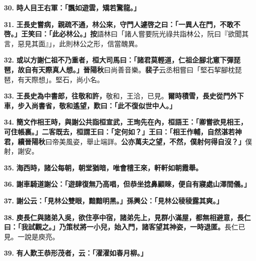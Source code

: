 \textbf{30.} \textbf{時人目王右軍：「飄如遊雲，矯若驚龍。」}

\textbf{31.} \textbf{王長史嘗病，親疏不通，林公來，守門人遽啓之曰：「一異人在門，不敢不啓。」王笑曰：「此必林公。」}{\footnotesize \textbf{按}語林曰「諸人嘗要阮光祿共詣林公，阮曰『欲聞其言，惡見其面』」，此則林公之形，信當醜異。}

\textbf{32.} \textbf{或以方謝仁祖不乃重者，桓大司馬曰：「諸君莫輕道，仁祖企腳北窻下彈琵琶，故自有天際真人想。」}{\footnotesize \textbf{晉陽秋}曰尚善音樂。\textbf{裴子}云丞相嘗曰「堅石挈腳枕琵琶，有天際想」。堅石，尚小名。}

\textbf{33.} \textbf{王長史為中書郎，往敬和許，}{\footnotesize 敬和，王洽，已見。}\textbf{爾時積雪，長史從門外下車，步入尚書省，敬和遙望，歎曰：「此不復似世中人。」}

\textbf{34.} \textbf{簡文作相王時，與謝公共詣桓宣武，王珣先在內，桓語王：「卿嘗欲見相王，可住帳裏。」二客既去，桓謂王曰：「定何如？」王曰：「相王作輔，自然湛若神君，}{\footnotesize \textbf{續晉陽秋}曰帝美風姿，舉止端詳。}\textbf{公亦萬夫之望，不然，僕射何得自沒？」}{\footnotesize 僕射，謝安。}

\textbf{35.} \textbf{海西時，諸公每朝，朝堂猶暗，唯會稽王來，軒軒如朝霞舉。}

\textbf{36.} \textbf{謝車騎道謝公：「遊肆復無乃高唱，但恭坐捻鼻顧睞，便自有寢處山澤間儀。」}

\textbf{37.} \textbf{謝公云：「見林公雙眼，黯黯明黑。」孫興公：「見林公稜稜露其爽。」}

\textbf{38.} \textbf{庾長仁與諸弟入吳，欲住亭中宿，諸弟先上，見群小滿屋，都無相避意，長仁曰：「我試觀之。」乃策杖將一小兒，始入門，諸客望其神姿，一時退匿。}{\footnotesize 長仁已見。一說是庾亮。}

\textbf{39.} \textbf{有人歎王恭形茂者，云：「濯濯如春月柳。」}